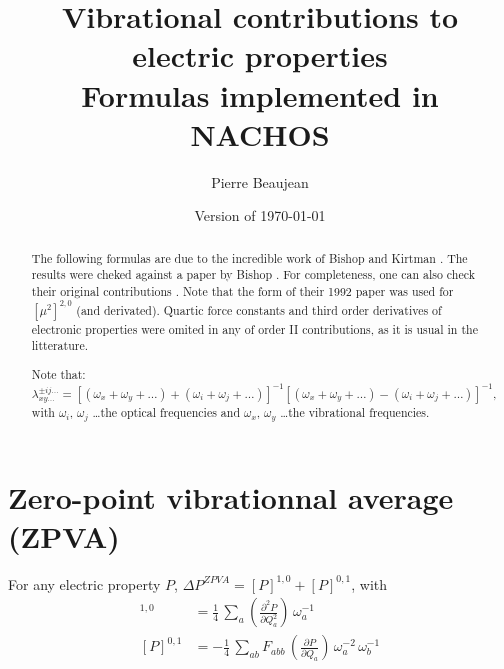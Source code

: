 \documentclass[12pt,a4paper]{article}
\title{Vibrational contributions to electric properties \\ Formulas implemented in NACHOS}
\author{Pierre Beaujean}
\date{Version of \today}
\begin{document}
\maketitle

\allowdisplaybreaks

\begin{abstract}
The following formulas are due to the incredible work of Bishop and Kirtman \cite{bishop_additional_1998}. The results were cheked against a paper by Bishop \cite{bishop_static_1998}. For completeness, one can also check their original contributions \cite{kirtman_evaluation_1990,bishop_perturbation_1991,bishop_compact_1992}. Note that the form of their 1992 paper \cite{bishop_compact_1992} was used for $[\mu^2]^{2,0}$ (and derivated). Quartic force constants and third order derivatives of electronic properties were omited in any of order II contributions, as it is usual in the litterature.

Note that:
\begin{equation*}
\lambda^{\pm ij\ldots}_{xy\ldots}= [(\omega_x+\omega_y+\ldots) +(\omega_i+\omega_j+\ldots)]^{-1}
 [(\omega_x+\omega_y+\ldots)-(\omega_i+\omega_j+\ldots)]^{-1},
\end{equation*}
with $\omega_i$, $\omega_j$ \ldots the optical frequencies and $\omega_{x}$, $\omega_y$ \ldots the vibrational frequencies.
\end{abstract}

\newcommand{\tdiff}[2]{\left(\frac{\partial #1}{ \partial #2}\right)}
\newcommand{\lb}[2]{\lambda^{\pm #1}_{#2}}

\section{Zero-point vibrationnal average (ZPVA)}
For any electric property $P$, $\Delta{P}^{ZPVA} = [P]^{1,0} + [P]^{0,1}$, with
\begin{align}
[P]^{1,0} &= \frac{1}{4}\,\sum_a \tdiff{^2P}{Q_a^2}\,\omega_a^{-1} \\
[P]^{0,1} &= -\frac{1}{4}\,\sum_{ab} F_{abb}\,\tdiff{P}{Q_a}\,\omega_a^{-2}\,\omega_b^{-1} 
\end{align}
\end{document}

